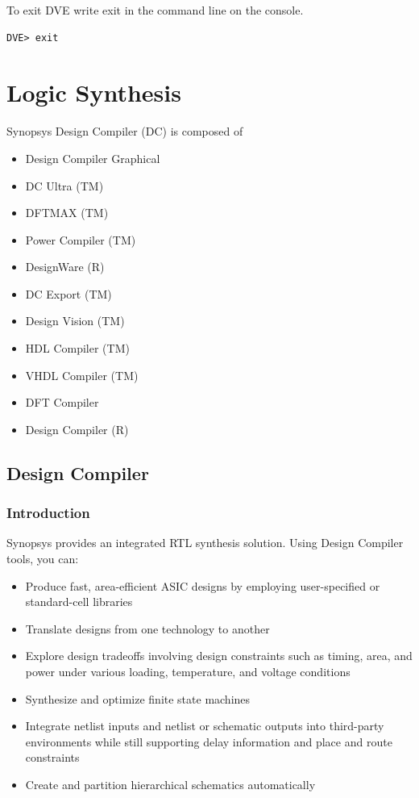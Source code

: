 \documentclass[a4paper,12pt,twoside]{article}
\begin{document}
To exit DVE write exit in the command line on the console.
\begin{verbatim}
DVE> exit
\end{verbatim}

\newpage
\section{Logic Synthesis}
Synopsys Design Compiler (DC) is composed of
\begin{itemize}
    \item Design Compiler Graphical
    \item DC Ultra (TM)
    \item DFTMAX (TM)
    \item Power Compiler (TM)
    \item DesignWare (R)
    \item DC Export (TM)
    \item Design Vision (TM)
    \item HDL Compiler (TM)
    \item VHDL Compiler (TM)
    \item DFT Compiler
    \item Design Compiler (R)
\end{itemize}
\subsection{Design Compiler}
\subsubsection{Introduction}
Synopsys provides an integrated RTL synthesis solution. Using Design Compiler tools, you can:
\begin{itemize}
    \item Produce fast, area-efficient ASIC designs by employing user-specified or standard-cell libraries
    \item Translate designs from one technology to another
    \item Explore design tradeoffs involving design constraints such as timing, area, and power under various loading, temperature, and voltage conditions
    \item Synthesize and optimize finite state machines
    \item Integrate netlist inputs and netlist or schematic outputs into third-party environments while still supporting delay information and place and route constraints
    \item Create and partition hierarchical schematics automatically
\end{itemize}
\end{document}
